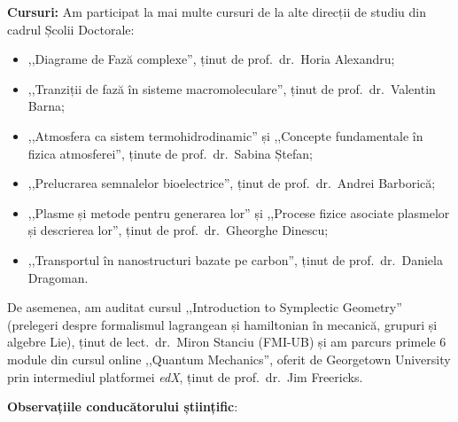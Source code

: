 \textbf{Cursuri:}
Am participat la mai multe cursuri de la alte direcții de studiu din cadrul Școlii Doctorale:
\begin{itemize}
    \item ,,Diagrame de Fază complexe'', ținut de prof.~dr.~Horia Alexandru;
    \item ,,Tranziții de fază în sisteme macromoleculare'', ținut de prof.~dr.~Valentin Barna;
    \item ,,Atmosfera ca sistem termohidrodinamic'' și ,,Concepte fundamentale în fizica atmosferei'', ținute de prof.~dr.~Sabina Ștefan;
    \item ,,Prelucrarea semnalelor bioelectrice'', ținut de prof.~dr.~Andrei Barborică;
    \item ,,Plasme și metode pentru generarea lor'' și ,,Procese fizice asociate plasmelor și descrierea lor'', ținut de prof.~dr.~Gheorghe Dinescu;
    \item ,,Transportul în nanostructuri bazate pe carbon'', ținut de prof.~dr.~Daniela Dragoman.
\end{itemize}
De asemenea, am auditat cursul ,,Introduction to Symplectic Geometry'' (prelegeri despre formalismul lagrangean și hamiltonian în mecanică, grupuri și algebre Lie), ținut de lect.~dr.~Miron Stanciu (FMI-UB) și am parcurs primele 6 module din cursul online ,,Quantum Mechanics'', oferit de Georgetown University prin intermediul platformei \textit{edX}, ținut de prof.~dr.~Jim Freericks.
\vspace{0.5em}

\textbf{Observațiile conducătorului științific}:

